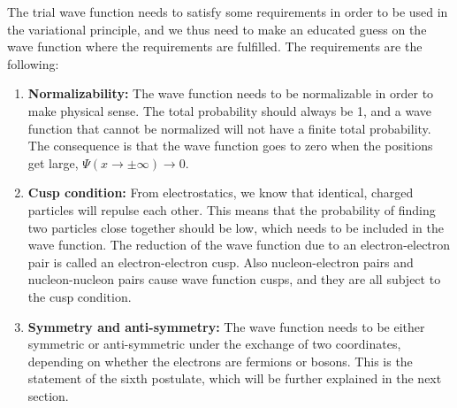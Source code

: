 The trial wave function needs to satisfy some requirements in order to be used in the variational principle, and we thus need to make an educated guess on the wave function where the requirements are fulfilled. The requirements are the following:
\fi

\begin{enumerate}
	\item \textbf{Normalizability:} The wave function needs to be normalizable in order to make physical sense. The total probability should always be 1, and a wave function that cannot be normalized will not have a finite total probability. The consequence is that the wave function goes to zero when the positions get large, $\Psi(x\rightarrow\pm\infty)\rightarrow 0$. 
	
	\item \textbf{Cusp condition:} From electrostatics, we know that identical, charged particles will repulse each other. This means that the probability of finding two particles close together should be low, which needs to be included in the wave function. The reduction of the wave function due to an electron-electron pair is called an electron-electron cusp. Also nucleon-electron pairs and nucleon-nucleon pairs cause wave function cusps, and they are all subject to the cusp condition.
	
	\item \textbf{Symmetry and anti-symmetry:} The wave function needs to be either symmetric or anti-symmetric under the exchange of two coordinates, depending on whether the electrons are fermions or bosons. This is the statement of the sixth postulate, which will be further explained in the next section.
\end{enumerate}

